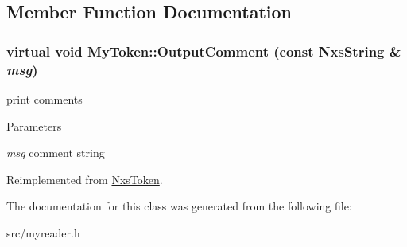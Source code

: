 \subsection{Member Function Documentation}
\hypertarget{classMyToken_a8b9a7b1c600e6d836c3f8e18a54cc71e}{
\subsubsection[{OutputComment}]{\setlength{\rightskip}{0pt plus 5cm}virtual void MyToken::OutputComment (const {\bf NxsString} \& {\em msg})}}
\label{classMyToken_a8b9a7b1c600e6d836c3f8e18a54cc71e}
print comments 
\begin{DoxyParams}{Parameters}
\item[{\em msg}]comment string \end{DoxyParams}


Reimplemented from \hyperlink{classNxsToken}{NxsToken}.

The documentation for this class was generated from the following file:\begin{DoxyCompactItemize}
\item 
src/myreader.h\end{DoxyCompactItemize}
